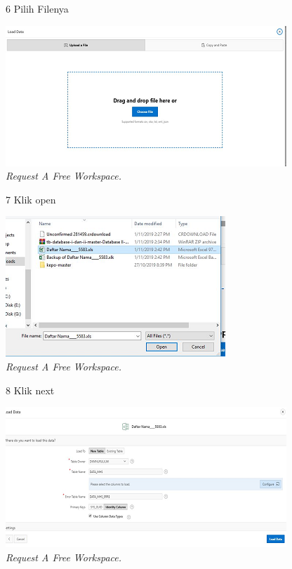 \begin{enumerate}
\begin{figure}[!htbp]
\item[6]Pilih Filenya

    \begin{center}
    \includegraphics[scale=0.5]{figures/5.png}
    \caption{\textit{Request A Free Workspace.}}
    \end{center}
    \end{figure}

\begin{figure}[!htbp]
\item[7]Klik open

    \begin{center}
    \includegraphics[scale=0.5]{figures/7.png}
    \caption{\textit{Request A Free Workspace.}}
    \end{center}
    \end{figure}

\begin{figure}[!htbp]
\item[8]Klik next

    \begin{center}
    \includegraphics[scale=0.5]{figures/8.png}
    \caption{\textit{Request A Free Workspace.}}
    \end{center}
    \end{figure}


\end{enumerate}
